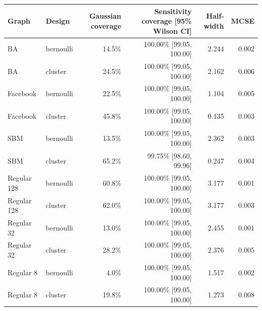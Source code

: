 \begin{tabular}{llrrrr}
\toprule
Graph & Design & Gaussian coverage & Sensitivity coverage [95\% Wilson CI] & Half-width & MCSE \\
\midrule
BA & bernoulli & 14.5\% & 100.00\% [99.05, 100.00] & 2.244 & 0.002 \\
BA & cluster & 24.5\% & 100.00\% [99.05, 100.00] & 2.162 & 0.006 \\
Facebook & bernoulli & 22.5\% & 100.00\% [99.05, 100.00] & 1.104 & 0.005 \\
Facebook & cluster & 45.8\% & 100.00\% [99.05, 100.00] & 0.135 & 0.003 \\
SBM & bernoulli & 13.5\% & 100.00\% [99.05, 100.00] & 2.362 & 0.003 \\
SBM & cluster & 65.2\% & 99.75\% [98.60, 99.96] & 0.247 & 0.004 \\
Regular 128 & bernoulli & 60.8\% & 100.00\% [99.05, 100.00] & 3.177 & 0.001 \\
Regular 128 & cluster & 62.0\% & 100.00\% [99.05, 100.00] & 3.177 & 0.003 \\
Regular 32 & bernoulli & 13.0\% & 100.00\% [99.05, 100.00] & 2.455 & 0.001 \\
Regular 32 & cluster & 28.2\% & 100.00\% [99.05, 100.00] & 2.376 & 0.005 \\
Regular 8 & bernoulli & 4.0\% & 100.00\% [99.05, 100.00] & 1.517 & 0.002 \\
Regular 8 & cluster & 19.8\% & 100.00\% [99.05, 100.00] & 1.273 & 0.008 \\
\bottomrule
\end{tabular}